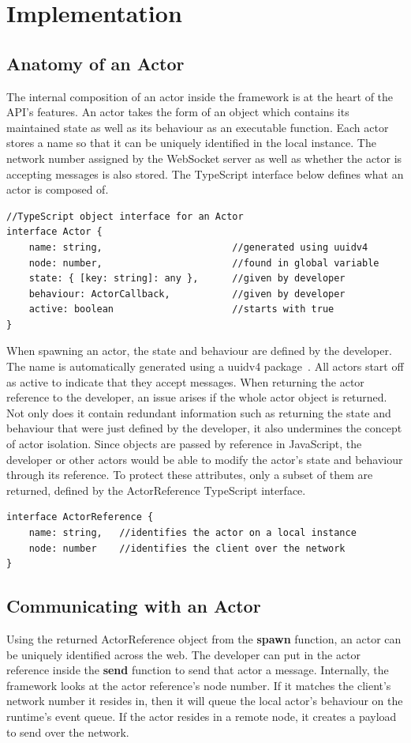 \documentclass[12pt, a4paper]{report}
\theoremstyle{definition}
\theoremstyle{definition}%
\theoremstyle{definition}%
\theoremstyle{definition}%
\theoremstyle{definition}%
\theoremstyle{definition}%
\begin{document}
\section{Implementation}
\subsection{Anatomy of an Actor}
The internal composition of an actor inside the framework is at the heart of the API's features. An actor takes the form of an object which contains its maintained state as well as its behaviour as an executable function. Each actor stores a name so that it can be uniquely identified in the local instance. The network number assigned by the WebSocket server as well as whether the actor is accepting messages is also stored. The TypeScript interface below defines what an actor is composed of.
\begin{lstlisting}
//TypeScript object interface for an Actor
interface Actor {
    name: string,                       //generated using uuidv4
    node: number,                       //found in global variable
    state: { [key: string]: any },      //given by developer
    behaviour: ActorCallback,           //given by developer
    active: boolean                     //starts with true
}
\end{lstlisting}
When spawning an actor, the state and behaviour are defined by the developer. The name is automatically generated using a uuidv4 package~\cite{uuidv4}. All actors start off as active to indicate that they accept messages. When returning the actor reference to the developer, an issue arises if the whole actor object is returned. Not only does it contain redundant information such as returning the state and behaviour that were just defined by the developer, it also undermines the concept of actor isolation. Since objects are passed by reference in JavaScript, the developer or other actors would be able to modify the actor's state and behaviour through its reference. To protect these attributes, only a subset of them are returned, defined by the ActorReference TypeScript interface.
\newpage
\begin{lstlisting}
interface ActorReference {
    name: string,   //identifies the actor on a local instance
    node: number    //identifies the client over the network
}
\end{lstlisting}
\subsection{Communicating with an Actor}
Using the returned ActorReference object from the \textbf{spawn} function, an actor can be uniquely identified across the web. The developer can put in the actor reference inside the \textbf{send} function to send that actor a message. Internally, the framework looks at the actor reference's node number. If it matches the client's network number it resides in, then it will queue the local actor's behaviour on the runtime's event queue. If the actor resides in a remote node, it creates a payload to send over the network. 
\end{document}
